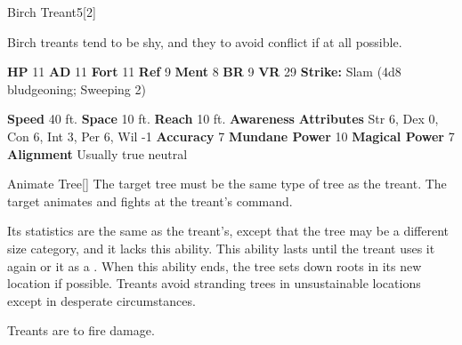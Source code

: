       
  \begin{monsubsection}{Birch Treant}{5}[2]
    \vspace{-1em}\vspace{-1em}
    \vspace{0em}

    
          Birch treants tend to be shy, and they to avoid conflict if at all possible.
        

    \begin{spellcontent}
      \begin{spelltargetinginfo}
        \pari \textbf{HP} 11 \monsep
          \textbf{AD} 11 \monsep
          \textbf{Fort} 11 \monsep
          \textbf{Ref} 9 \monsep
          \textbf{Ment} 8
        \pari \textbf{BR} 9 \monsep
        \textbf{VR} 29
        \pari \textbf{Strike:}
            Slam  (4d8 bludgeoning; Sweeping 2)
      \end{spelltargetinginfo}
    \end{spellcontent}
    \begin{monsterfooter}
      \pari \textbf{Speed} 40 ft. \monsep
        \textbf{Space} 10 ft. \monsep
        \textbf{Reach} 10 ft.
      \pari \textbf{Awareness} 
      \pari \textbf{Attributes}
        Str 6, Dex 0,
        Con 6, Int 3,
        Per 6, Wil -1
      \pari \textbf{Accuracy} 7 \monsep
        \textbf{Mundane Power} 10 \monsep
      \textbf{Magical Power} 7
      \pari \textbf{Alignment} Usually true neutral
    \end{monsterfooter}
  \end{monsubsection}
  \begin{freeability}{Animate Tree}[]
      The target tree must be the same type of tree as the treant.
        The target animates and fights at the treant's command.

        Its statistics are the same as the treant's, except that the tree may be a different size category, and it lacks this ability.
        This ability lasts until the treant uses it again or  it as a .
        When this ability ends, the tree sets down roots in its new location if possible.
        Treants avoid stranding trees in unsustainable locations except in desperate circumstances.
    \end{freeability}
  
        Treants are  to fire damage.
      
